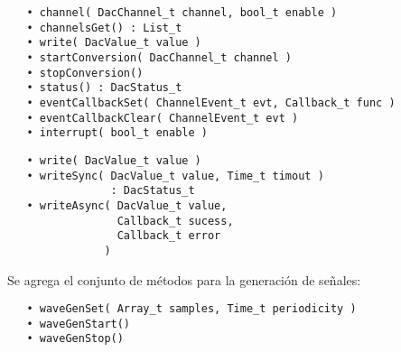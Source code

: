 \begin{verbatim}
   • channel( DacChannel_t channel, bool_t enable )
   • channelsGet() : List_t
   • write( DacValue_t value )
   • startConversion( DacChannel_t channel )
   • stopConversion()
   • status() : DacStatus_t
   • eventCallbackSet( ChannelEvent_t evt, Callback_t func )
   • eventCallbackClear( ChannelEvent_t evt )
   • interrupt( bool_t enable )
\end{verbatim}


\begin{verbatim}
   • write( DacValue_t value )
   • writeSync( DacValue_t value, Time_t timout ) 
                : DacStatus_t
   • writeAsync( DacValue_t value, 
                 Callback_t sucess, 
                 Callback_t error 
               )
\end{verbatim}

Se agrega el conjunto de métodos para la generación de señales:

\begin{verbatim}
   • waveGenSet( Array_t samples, Time_t periodicity )
   • waveGenStart()
   • waveGenStop()
\end{verbatim}
